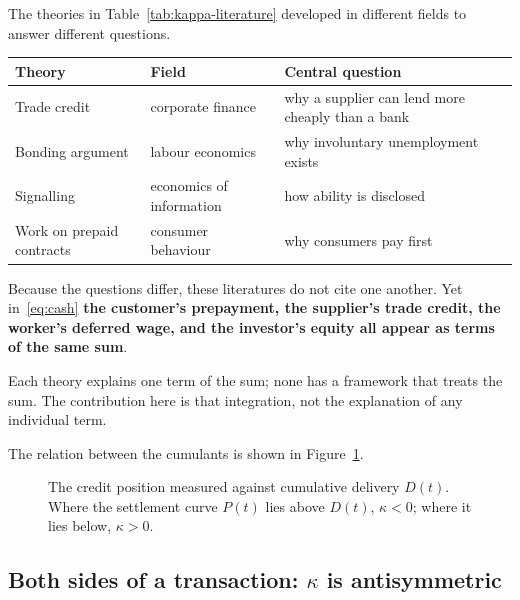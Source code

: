 \begin{remark}
\label{rem:disjoint-literatures}
The theories in Table~\ref{tab:kappa-literature} developed in different fields to answer
different questions.

\begin{center}
\begin{tabularx}{\textwidth}{@{}llX@{}}
\toprule
Theory & Field & Central question \\
\midrule
Trade credit & corporate finance & why a supplier can lend more cheaply than a bank \\
Bonding argument & labour economics & why involuntary unemployment exists \\
Signalling & economics of information & how ability is disclosed \\
Work on prepaid contracts & consumer behaviour & why consumers pay first \\
\bottomrule
\end{tabularx}
\label{tab:disjoint-theories-questions}
\end{center}

Because the questions differ, these literatures do not cite one another. Yet
in~\eqref{eq:cash} \textbf{the customer's prepayment, the supplier's trade credit, the
worker's deferred wage, and the investor's equity all appear as terms of the same sum}.

Each theory explains one term of the sum; none has a framework that treats the sum. The
contribution here is that integration, not the explanation of any individual term.
\end{remark}

The relation between the cumulants is shown in Figure~\ref{fig:kappa}.

\begin{figure}[htbp]
\centering
{}
\caption{The credit position measured against cumulative delivery $D(t)$. Where the settlement curve $P(t)$ lies above $D(t)$, $\kappa<0$; where it lies below, $\kappa>0$.}
\label{fig:kappa}
\end{figure}

\subsection{Both sides of a transaction: $\kappa$ is antisymmetric}
\label{sec:kappa-antisym}

